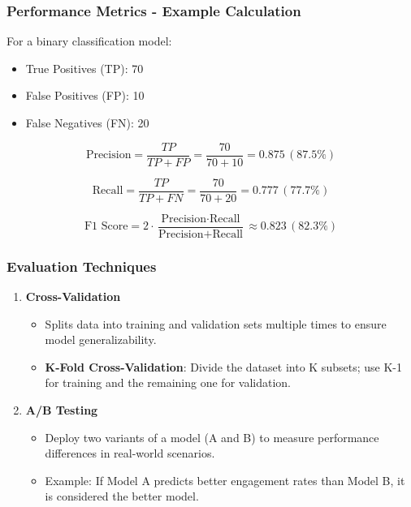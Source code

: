 \documentclass[aspectratio=169]{beamer}
\begin{document}
\begin{frame}[fragile]
    \frametitle{Performance Metrics - Example Calculation}
    For a binary classification model:
    \begin{itemize}
        \item True Positives (TP): 70
        \item False Positives (FP): 10
        \item False Negatives (FN): 20
    \end{itemize}
    
    \begin{equation}
        \text{Precision} = \frac{TP}{TP + FP} = \frac{70}{70 + 10} = 0.875 \, (87.5\%)
    \end{equation}
    
    \begin{equation}
        \text{Recall} = \frac{TP}{TP + FN} = \frac{70}{70 + 20} = 0.777 \, (77.7\%)
    \end{equation}
    
    \begin{equation}
        \text{F1 Score} = 2 \cdot \frac{\text{Precision} \cdot \text{Recall}}{\text{Precision} + \text{Recall}} \approx 0.823 \, (82.3\%)
    \end{equation}
\end{frame}

\begin{frame}[fragile]
    \frametitle{Evaluation Techniques}
    \begin{enumerate}
        \item \textbf{Cross-Validation}
        \begin{itemize}
            \item Splits data into training and validation sets multiple times to ensure model generalizability.
            \item \textbf{K-Fold Cross-Validation}: Divide the dataset into K subsets; use K-1 for training and the remaining one for validation.
        \end{itemize}
        
        \item \textbf{A/B Testing}
        \begin{itemize}
            \item Deploy two variants of a model (A and B) to measure performance differences in real-world scenarios.
            \item Example: If Model A predicts better engagement rates than Model B, it is considered the better model.
        \end{itemize}
    \end{enumerate}
\end{frame}
\end{document}
